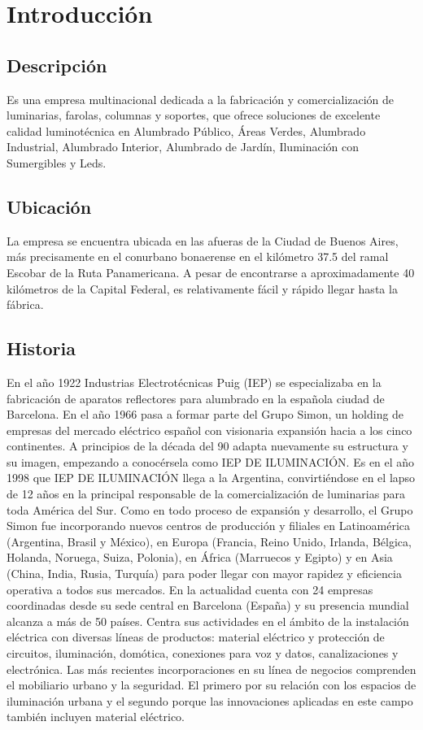 \section{Introducci\'on}
\subsection{Descripción}
Es una empresa multinacional dedicada a la fabricación y comercialización de luminarias, farolas, columnas y soportes, que ofrece soluciones de excelente calidad luminotécnica en Alumbrado Público, Áreas Verdes, Alumbrado Industrial, Alumbrado Interior, Alumbrado de Jardín, Iluminación con Sumergibles y Leds.

\subsection{Ubicación}
La empresa se encuentra ubicada en las afueras de la Ciudad de Buenos Aires, m\'as precisamente en el conurbano bonaerense en el kil\'ometro 37.5 del ramal Escobar de la Ruta Panamericana. A pesar de encontrarse a aproximadamente 
40 kil\'ometros de la Capital Federal, es relativamente f\'acil y r\'apido llegar hasta la f\'abrica.

\subsection{Historia}
En el año 1922 Industrias Electrotécnicas Puig (IEP) se especializaba en la fabricación de aparatos reflectores para alumbrado en la española ciudad de Barcelona.
En el año 1966 pasa a formar parte del Grupo Simon, un holding de empresas del mercado eléctrico español con visionaria expansión hacia a los cinco continentes.
A principios de la década del 90 adapta nuevamente su estructura y su imagen, empezando a conocérsela como IEP DE ILUMINACIÓN.
Es en el año 1998 que IEP DE ILUMINACIÓN llega a la Argentina, convirtiéndose en el lapso de 12 años en la principal responsable de la comercialización de luminarias para toda América del Sur. 
Como en todo proceso de expansión y desarrollo, el Grupo Simon fue incorporando nuevos centros de producción y filiales en Latinoamérica (Argentina, Brasil y México), en Europa (Francia, Reino Unido, Irlanda, Bélgica, Holanda, Noruega, Suiza, Polonia), en África (Marruecos y Egipto) y en Asia (China, India, Rusia, Turquía) para poder llegar con mayor rapidez y eficiencia operativa a todos sus mercados.
En la actualidad cuenta con 24 empresas coordinadas desde su sede central en Barcelona (España) y su presencia mundial alcanza a más de 50 países. Centra sus actividades en el ámbito de la instalación eléctrica con diversas líneas de productos: material eléctrico y protección de circuitos, iluminación, domótica, conexiones para voz y datos, canalizaciones y electrónica. Las más recientes incorporaciones en su línea de negocios comprenden el mobiliario urbano y la seguridad. El primero por su relación con los espacios de iluminación urbana y el segundo porque las innovaciones aplicadas en este campo también incluyen material eléctrico.

